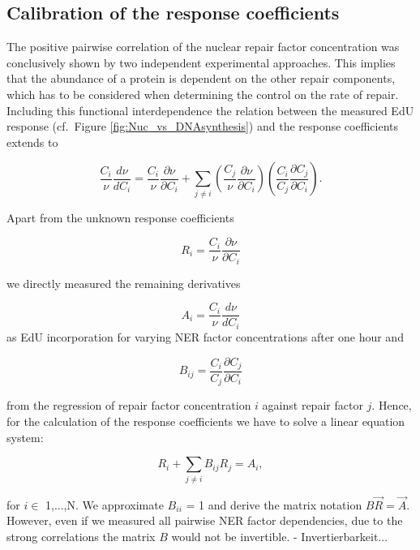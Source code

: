 \newpage

\subsection{Calibration of the response coefficients}
The positive pairwise correlation of the nuclear repair factor concentration was conclusively shown by two independent experimental approaches. This implies that the abundance of a protein is dependent on the other repair components, which has to be considered when determining the control on the rate of repair. Including this functional interdependence the relation between the measured EdU response (cf.\ Figure \ref{fig:Nuc_vs_DNAsynthesis}) and the response coefficients extends to 

\begin{equation}
 \frac{C_i}{\nu}\frac{d \nu}{d C_i} = \frac{C_i}{\nu}\frac{\partial \nu}{\partial C_i} + \sum_{j \neq i} \left( \frac{C_j}{\nu}\frac{\partial \nu}{\partial C_i}\right) \left(\frac{C_i}{C_j}\frac{\partial C_j}{\partial C_i}\right). 
\end{equation}    

Apart from the unknown response coefficients

\begin{equation}
	R_i = \frac{C_i}{\nu}\frac{\partial \nu}{\partial C_i} \nonumber
\end{equation}

we directly measured the remaining derivatives 

\begin{equation}
A_i = \frac{C_i}{\nu}\frac{d \nu}{d C_i} \nonumber
\end{equation}
as EdU incorporation for varying NER factor concentrations after one hour and

\begin{equation}
B_{ij} = \frac{C_i}{C_j}\frac{\partial C_j}{\partial C_i} \nonumber
\end{equation}

from the regression of repair factor concentration $i$ against repair factor $j$. Hence, for the calculation of the response coefficients we have to solve a linear equation system:

\begin{equation}
	R_i + \sum_{j\neq i} B_{ij}R_j = A_i,
\end{equation}

for $i \in$ 1,...,N. We approximate $B_{ii}$ = 1 and derive the matrix notation $B\vec{R}=\vec{A}$. However, even if we measured all pairwise NER factor dependencies, due to the strong correlations the matrix $B$ would not be invertible.
- Invertierbarkeit...

